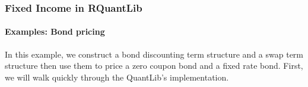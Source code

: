\documentclass[compress]{beamer}
\begin{document}
\begin{frame}
	\frametitle{Fixed Income in RQuantLib}
	\framesubtitle{Examples: Bond pricing}	
In this example, we construct a bond discounting term structure and a swap term structure then use them to price a zero coupon bond and a fixed rate bond. First, we will walk quickly through the QuantLib's implementation.
\vskip5pt
\pagecolor{bgcolor}
\tiny
\noindent
\ttfamily
\hlstd{}\hspace*{\fill}\\
\hlstd{}\hspace*{\fill}\\
\hlstd{}\hspace*{\fill}\\
\hspace*{\fill}\\
\hlstd{}\hspace*{\fill}\\
\hlstd{}\hspace*{\fill}\\
\hlstd{}\hspace*{\fill}\\
\hlsym{;}\hspace*{\fill}\\
\hlstd{}\hspace*{\fill}\\
\hspace*{\fill}\\
\hlstd{}\hlsym{\{}\hspace*{\fill}\\
\hlstd{}\hlsym{()\ \{\ }\hlstd{}\hlstd{}\hlstd{}\hlsym{;\ \}}\hspace*{\fill}\\
\hlstd{}\hspace*{\fill}\\
\hlsym{\}}\hspace*{\fill}\\
\hlstd{}\hspace*{\fill}\\
\hlstd{}\hspace*{\fill}\\

\end{frame}
\end{document}
